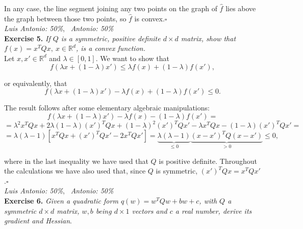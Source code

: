 \documentclass[12pt]{article}
\newcommand*{\QED}{\null\nobreak\hfill\ensuremath{\square}}%
\begin{document}
In any case, the line segment joining any two points on the graph of $\hat f$ lies above the graph between those two points, so $\hat f$ is convex.\QED\\

\textit{Luis Antonio: 50\%}, \ \textit{Antonio: 50\%}\\
\textbf{Exercise 5. }\emph{If \( Q \) is a symmetric, positive definite \( d \times d \) matrix, show that \( f(x) = x^TQx, \ x \in \mathbb{R}^d \), is a convex function.}\\

Let $x,x'\in \mathbb R^d$ and $\lambda\in[0,1]$. We want to show that
\[
f(\lambda x + (1-\lambda )x')\leq \lambda f(x)+(1-\lambda)f(x'),
\]

or equivalently, that
\[
f(\lambda x + (1-\lambda )x') - \lambda f(x)+(1-\lambda)f(x') \leq 0.
\]

The result follows after some elementary algebraic manipulations:
\[
f(\lambda x + (1-\lambda )x') - \lambda f(x)-(1-\lambda)f(x') =
\]
\[
=\lambda^2x^TQx + 2\lambda(1-\lambda)(x')^TQx + (1-\lambda)^2 (x')^TQx' -\lambda x^TQx - (1-\lambda)(x')^TQx' =
\]
\[
= \lambda(\lambda - 1)\left[x^TQx + (x')^TQx' - 2x^TQx' \right] = \underbrace{\lambda(\lambda - 1)}_{\leq 0}\underbrace{(x-x')^TQ(x-x')}_{> 0} \leq 0,
\]

where in the last inequality we have used that $Q$ is positive definite. Throughout the calculations we have also used that, since $Q$ is symmetric, $(x')^TQx=x^TQx'$.\QED\\

%

\textit{Luis Antonio: 50\%}, \ \textit{Antonio: 50\%}\\
\textbf{Exercise 6. }\emph{Given a quadratic form \( q(w) = w^TQw + bw + c \), with \( Q \) a symmetric \( d\times d \) matrix, \( w,b\) being \(d\times 1 \) vectors and \( c \) a real number, derive its gradient and Hessian}.
\end{document}
